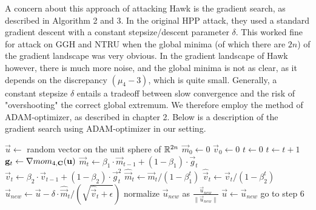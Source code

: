 {{A concern about this approach of attacking Hawk is the gradient search, as described in Algorithm 2 and 3. In the original HPP attack, they used a standard gradient descent with a constant stepsize/descent parameter $\delta$. This
worked fine for attack on GGH and NTRU when the global minima (of which there are $2n$) of the gradient landscape was very obvious. In the gradient landscape of Hawk however, there is much more noise, and the global minima is
not as clear, as it depends on the discrepancy $(\mu_4 - 3)$, which is quite small. Generally, a constant stepsize $\delta$ entails a tradeoff between slow convergence and the risk of "overshooting" the correct global extremum.  
We therefore employ the method of ADAM-optimizer, as described in chapter 2.
Below is a description of the gradient search using ADAM-optimizer in our setting.

\begin{algorithm}[H]
    \caption{$\mathsf{gradient \ descent \ ADAM}$}
\begin{algorithmic}[1]
    \State $\vec{u} \gets $ random vector on the unit sphere of $\mathbb{R}^{2n}$
    \State $\vec{m}_0 \gets 0$ 
    \State $\vec{v}_0 \gets 0$ 
    \State $t \gets 0$ 
    \Loop
    \State $t \gets t + 1$
    \State $\mathbf{g}_t \gets \nabla mom_{4, \mathbf{C}}(\mathbf{u})$
    \State $\vec{m}_t \gets \beta_1 \cdot \vec{m}_{t-1} + (1 - \beta_1) \cdot \vec{g}_t$
    \State $\vec{v}_t \gets \beta_2 \cdot \vec{v}_{t-1} + (1 - \beta_2) \cdot \vec{g}_t^2$
    \State $\hat{\vec{m}}_t \gets \vec{m}_t / (1 - \beta_1 ^t) $
    \State $\hat{\vec{v}}_t \gets \vec{v}_t / (1 - \beta_2 ^t) $
    \State $\vec{u}_{new} \gets \vec{u} - \delta \cdot \hat{\vec{m}}_t / (\sqrt{\hat{\vec{v}}_t + \epsilon})$ 
    \State normalize $\vec{u}_{new}$ as $\frac{\vec{u}_{new}}{\lVert \vec{u}_{new} \rVert}$
     
    \State {}
    \Else 
    \State $\vec{u} \gets \vec{u}_{new}$
    \State go to step 6
    \EndIf
    \EndLoop
\end{algorithmic}
\end{algorithm}

}}
